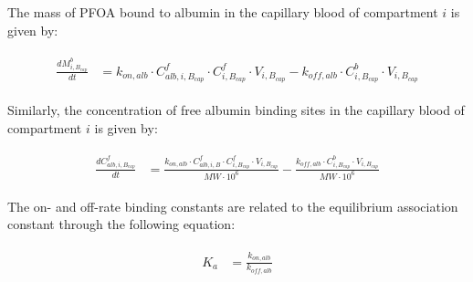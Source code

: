 \documentclass[preprint,12pt,authoryear]{elsarticle}
\begin{document}
The mass of PFOA bound to albumin in the capillary blood of compartment $i$ is given by:

\begin{align}
\begin{aligned}
\frac{dM_{i,B_{cap}}^b}{dt} &= k_{on,alb} \cdot C_{alb,i,B_{cap}}^f \cdot C_{i,B_{cap}}^f \cdot V_{i,B_{cap}} 
- k_{off,alb} \cdot C_{i,B_{cap}}^b \cdot V_{i,B_{cap}}
\end{aligned}
\label{eq:PFOA_blood_ODE_bound}
\end{align}

Similarly, the concentration of free albumin binding sites in the capillary blood of compartment $i$ is given by:

\begin{align}
\begin{aligned}
\frac{dC_{alb,i,B_{cap}}^f}{dt} &= \frac{k_{on,alb} \cdot C_{alb,i,B}^f \cdot C_{i,B_{cap}}^f \cdot V_{i,B_{cap}}}{MW \cdot 10^6} 
- \frac{k_{off,alb} \cdot C_{i,B_{cap}}^b \cdot V_{i,B_{cap}}}{MW \cdot 10^6}
\end{aligned}
\label{eq:PFOA_blood_ODE_albumin}
\end{align}

The on- and off-rate binding constants are related to the equilibrium association constant through the following equation:

\begin{align}
\begin{aligned}
K_a &= \frac{k_{on,alb}}{k_{off,alb}}
\end{aligned}
\label{eq:PFOA_association_constant}
\end{align}
\end{document}
